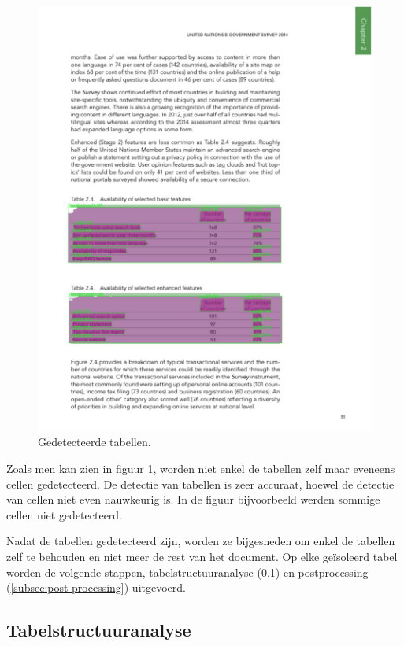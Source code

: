 \begin{figure}[H]
\begin{minipage}{0.5\textwidth}
        \centering
        \includegraphics[width=1\textwidth]{img/tabel_detectie_voorbeeld_gedetecteerd.png}
        \caption{Gedetecteerde tabellen.}
        \label{fig:tabel-detectie-gedetecteerd}
    \end{minipage}
\end{figure}

Zoals men kan zien in figuur \ref{fig:tabel-detectie-gedetecteerd}, worden niet enkel de tabellen zelf maar eveneens cellen gedetecteerd. De detectie van tabellen is zeer accuraat, hoewel de detectie van cellen niet even nauwkeurig is. In de figuur bijvoorbeeld werden sommige cellen niet gedetecteerd.

Nadat de tabellen gedetecteerd zijn, worden ze bijgesneden om enkel de tabellen zelf te behouden en niet meer de rest van het document. Op elke geïsoleerd tabel worden de volgende stappen, tabelstructuuranalyse (\ref{subsec:tabel-structuur-analyse}) en postprocessing (\ref{subsec:post-processing}) uitgevoerd.

\subsection{Tabelstructuuranalyse}
\label{subsec:tabel-structuur-analyse}

